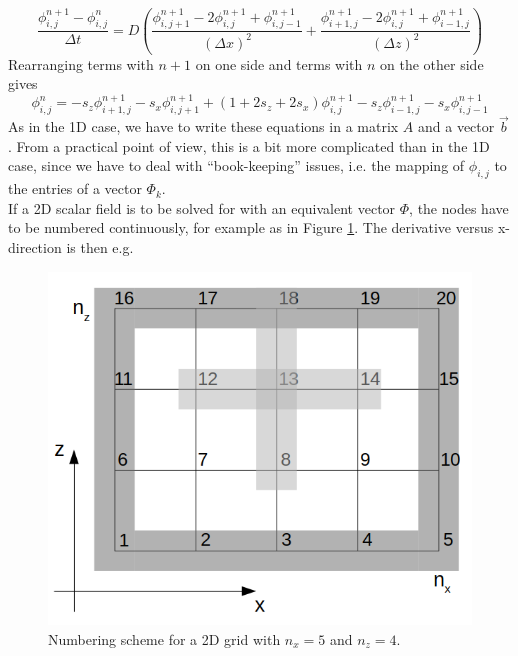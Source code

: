 \begin{equation}
\frac{\phi^{n+1}_{i,j}-\phi^{n}_{i,j}}{\Delta t} = D ( \frac{\phi^{n+1}_{i,j+1}-2\phi^{n+1}_{i,j}+\phi^{n+1}_{i,j-1}}{(\Delta x)^2} + \frac{\phi^{n+1}_{i+1,j}-2\phi^{n+1}_{i,j}+\phi^{n+1}_{i-1,j}}{(\Delta z)^2} )
\end{equation}
Rearranging terms with $n + 1$ on one side and terms with $n$ on the other side gives
\begin{equation}
\phi^{n}_{i,j} =-s_z \phi^{n+1}_{i+1,j}-s_x \phi^{n+1}_{i,j+1} +(1+2s_z+2s_x) \phi^{n+1}_{i,j} -s_z \phi^{n+1}_{i-1,j}-s_x \phi^{n+1}_{i,j-1}
\label{eq:2Ddescrete}
\end{equation}
As in the 1D case, we have to write these equations in a matrix $A$ and a vector $\vec{b}$. From a practical point of view, this is a bit more complicated than in the 1D case, since we have to deal with “book-keeping” issues, i.e. the mapping of $\phi_{i,j}$ to the entries of a vector $\Phi_k$. 
\\
If a 2D scalar field is to be solved for with an equivalent vector $\Phi$, the nodes have to be numbered continuously, for example as in Figure \ref{fig:2d-grid-mapping}. The derivative versus x-direction is then e.g.

\begin{figure}[ht]\centering
\includegraphics[width=\linewidth]{2d-grid-mapping}
\caption{Numbering scheme for a 2D grid with $n_x = 5$ and $n_z = 4$.}
\label{fig:2d-grid-mapping}
\end{figure}

